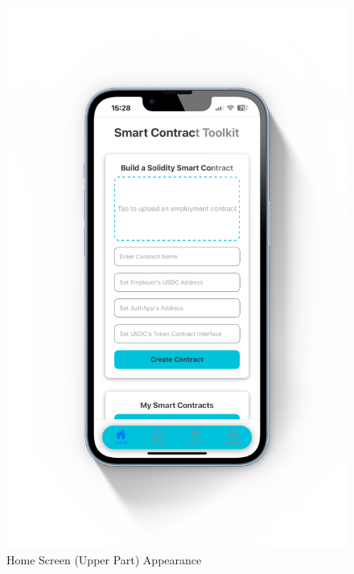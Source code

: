 \begin{figure}[!ht]
    \centering
    \begin{minipage}{0.49\textwidth}
        \centering
        \includegraphics[scale=0.07]{LATEX/Appendices/Images/Software/Frontend/home_screen_1.png}
        \caption{Home Screen (Upper Part) Appearance}
        \label{fig:home screen 1}
    \end{minipage}\hfill %
    \begin{minipage}{0.49\textwidth}
        \centering

\end{minipage}
\end{figure}
